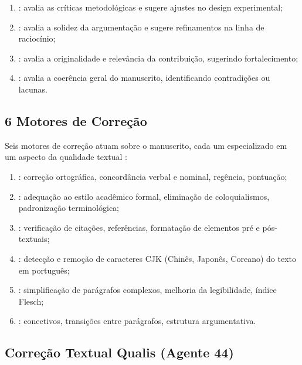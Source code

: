 \begin{enumerate}
\item {}: avalia as críticas metodológicas
      e sugere ajustes no design experimental;
\item {}: avalia a solidez da
      argumentação e sugere refinamentos na linha de raciocínio;
\item {}: avalia a originalidade e
      relevância da contribuição, sugerindo fortalecimento;
\item {}: avalia a coerência geral do
      manuscrito, identificando contradições ou lacunas.
\end{enumerate}

\subsection{6 Motores de Correção}

Seis motores de correção atuam sobre o manuscrito, cada um especializado em
um aspecto da qualidade textual \cite{opencode2026scanner}:

\begin{enumerate}
\item {}: correção ortográfica, concordância
      verbal e nominal, regência, pontuação;
\item {}: adequação ao estilo acadêmico formal,
      eliminação de coloquialismos, padronização terminológica;
\item {}: verificação de citações, referências,
      formatação de elementos pré e pós-textuais;
\item {}: detecção e remoção de caracteres CJK
      (Chinês, Japonês, Coreano) do texto em português;
\item {}: simplificação de parágrafos complexos,
      melhoria da legibilidade, índice Flesch;
\item {}: conectivos, transições entre parágrafos,
      estrutura argumentativa.
\end{enumerate}

\subsection{Correção Textual Qualis (Agente 44)}

